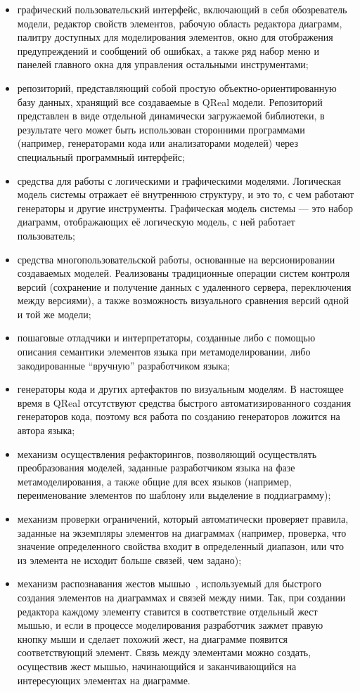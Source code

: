 \documentclass[a4]{article}
\begin{document}
\begin{itemize}
\item графический пользовательский интерфейс, включающий в себя обозреватель модели, редактор свойств элементов, рабочую область редактора диаграмм, палитру доступных для моделирования элементов, окно для отображения предупреждений и сообщений об ошибках, а также ряд набор меню и панелей главного окна для управления остальными инструментами;
\item репозиторий, представляющий собой простую объектно-ориентированную базу данных, хранящий все создаваемые в QReal модели.  Репозиторий представлен в виде отдельной динамически загружаемой библиотеки, в результате чего может быть использован сторонними программами (например, генераторами кода или анализаторами моделей) через специальный программный интерфейс;
\item средства для работы с логическими и графическими моделями. Логическая модель системы отражает её внутреннюю структуру, и это то, с чем работают генераторы и другие инструменты. Графическая модель системы --- это набор диаграмм, отображающих её логическую модель, с ней работает пользователь;
\item средства многопользовательской работы, основанные на версионировании создаваемых моделей. Реализованы традиционные операции систем контроля версий (сохранение и получение данных с удаленного сервера, переключения между версиями), а также возможность визуального сравнения версий одной и той же модели;
\item пошаговые отладчики и интерпретаторы, созданные либо с помощью описания семантики элементов языка при метамоделировании, либо закодированные ``вручную'' разработчиком языка;
\item генераторы кода и других артефактов по визуальным моделям. В настоящее время в QReal отсутствуют средства быстрого автоматизированного создания генераторов кода, поэтому вся работа по созданию генераторов ложится на автора языка;
\item механизм осуществления рефакторингов, позволяющий осуществлять преобразования моделей, заданные разработчиком языка на фазе метамоделирования, а также общие для всех языков (например, переименование элементов по шаблону или выделение в поддиаграмму);
\item механизм проверки ограничений, который автоматически проверяет правила, заданные на экземпляры элементов на диаграммах (например, проверка, что значение определенного свойства входит в определенный диапазон, или что из элемента не исходит больше связей, чем задано);
\item механизм распознавания жестов мышью~\cite{qreal3}, используемый для быстрого создания элементов на диаграммах и связей между ними. Так, при создании редактора каждому элементу ставится в соответствие отдельный жест мышью, и если в процессе моделирования разработчик зажмет правую кнопку мыши и сделает похожий жест, на диаграмме появится соответствующий элемент. Связь между элементами можно создать, осуществив жест мышью, начинающийся и заканчивающийся на интересующих элементах на диаграмме.
\end{itemize}
\end{document}
